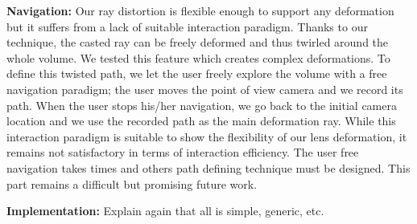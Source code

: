 \vspace{0.15cm}
\noindent\textbf{Navigation:} Our ray distortion is flexible enough to support any deformation but it suffers from a lack of suitable interaction paradigm. Thanks to our technique, the casted ray can be freely deformed and thus twirled around the whole volume. We tested this feature which creates complex deformations. To define this twisted path, we let the user freely explore the volume with a free navigation paradigm; the user moves the point of view camera and we record its path. When the user stops his/her navigation, we go back to the initial camera location and we use the recorded path as the main deformation ray. While this interaction paradigm is suitable to show the flexibility of our lens deformation, it remains not satisfactory in terms of interaction efficiency. The user free navigation takes times and others path defining technique must be designed. This part remains a difficult but promising future work.

\vspace{0.15cm}
\noindent\textbf{Implementation:} Explain again that all is simple, generic, etc.
